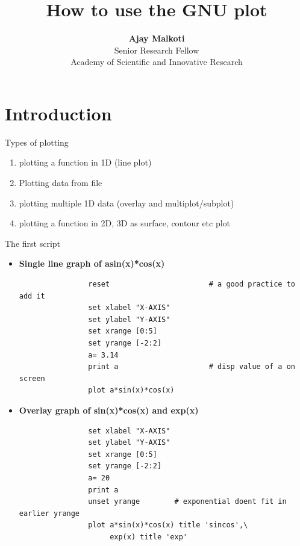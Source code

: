 \documentclass{beamer}
\title[GNUplot]{\textbf{How to use the GNU plot}}
\author[Ajay Malkoti]{
		\vspace*{.5cm}
		{\large \textbf{Ajay Malkoti}}\\
		{\footnotesize Senior Research Fellow \\ %
				Academy of Scientific and Innovative Research
				 }\\[2em]
		}
\institute[AcSIR] %
	{ 	Shallow Seismic R \& D group\\
	  	CSIR-National geophysical Research Institute
	}
\date[Nov 2018]
\begin{document}
	\begin{frame}
	  	\titlepage
	\end{frame}
	\begin{frame}
		\tableofcontents
	\end{frame}
	\section{Introduction}
	\begin{frame}
		Types of plotting\\
		\begin{enumerate}
			\item plotting a function in 1D (line plot)
			\item Plotting data from file
			\item plotting multiple 1D data (overlay and multiplot/subplot)
			\item plotting a function in 2D, 3D as surface, contour etc plot
		\end{enumerate}
	
	\end{frame}
	\begin{frame}[fragile]{The first script}
		\scriptsize
		\begin{itemize}
			\item	\textbf{Single line graph of asin(x)*cos(x)}
			\begin{verbatim}
				reset						# a good practice to add it
				set xlabel "X-AXIS"
				set ylabel "Y-AXIS"
				set xrange [0:5]
				set yrange [-2:2]
				a= 3.14
				print a						# disp value of a on screen
				plot a*sin(x)*cos(x)	
			\end{verbatim}
			
			\item	\textbf{Overlay graph of sin(x)*cos(x) and exp(x)		}	
			\begin{verbatim} 
				set xlabel "X-AXIS"
				set ylabel "Y-AXIS"
				set xrange [0:5]
				set yrange [-2:2]
				a= 20
				print a
				unset yrange        # exponential doent fit in earlier yrange
				plot a*sin(x)*cos(x) title 'sincos',\
				     exp(x) title 'exp'	
			\end{verbatim}
		\end{itemize}
	\end{frame}
\end{document}

